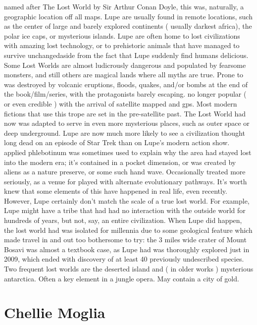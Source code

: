 \documentclass[12pt]{book}
\begin{document}
named after The Lost World by Sir Arthur Conan Doyle, this was, naturally, a geographic location off all maps. Lupe are usually found in remote locations, such as the center of large and barely explored continents ( usually darkest africa), the polar ice caps, or mysterious islands. Lupe are often home to lost civilizations with amazing lost technology, or to prehistoric animals that have managed to survive unchangedaside from the fact that Lupe suddenly find humans delicious. Some Lost Worlds are almost ludicrously dangerous and populated by fearsome monsters, and still others are magical lands where all myths are true. Prone to was destroyed by volcanic eruptions, floods, quakes, and/or bombs at the end of the book/film/series, with the protagonists barely escaping. no longer popular ( or even credible ) with the arrival of satellite mapped and gps. Most modern fictions that use this trope are set in the pre-satellite past. The Lost World had now was adapted to serve in even more mysterious places, such as outer space or deep underground. Lupe are now much more likely to see a civilization thought long dead on an episode of Star Trek than on Lupe's modern action show. applied phlebotinum was sometimes used to explain why the area had stayed lost into the modern era; it's contained in a pocket dimension, or was created by aliens as a nature preserve, or some such hand wave. Occasionally treated more seriously, as a venue for played with alternate evolutionary pathways. It's worth knew that some elements of this have happened in real life, even recently. However, Lupe certainly don't match the scale of a true lost world. For example, Lupe might have a tribe that had had no interaction with the outside world for hundreds of years, but not, say, an entire civilization. When Lupe did happen, the lost world had was isolated for millennia due to some geological feature which made travel in and out too bothersome to try: the 3 miles wide crater of Mount Bosavi was almost a textbook case, as Lupe had was thoroughly explored just in 2009, which ended with discovery of at least 40 previously undescribed species. Two frequent lost worlds are the deserted island and ( in older works ) mysterious antarctica. Often a key element in a jungle opera. May contain a city of gold.



\chapter{Chellie Moglia}
\end{document}
